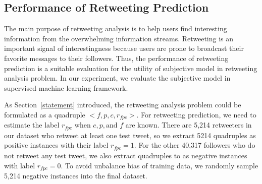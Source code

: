 \documentclass{acm_proc_article-sp}
\begin{document}
\subsection{Performance of Retweeting Prediction}
\label{performance}
The main purpose of retweeting analysis is to help users find interesting information from the overwhelming information streams. 
Retweeting is an important signal of interestingness because users are prone to broadcast their favorite messages to their followers. 
Thus, the performance of retweeting prediction is a suitable evaluation for the utility of subjective model in retweeting analysis problem.
In our experiment, we evaluate the subjective model in supervised machine learning framework.

As Section~\ref{statement} introduced, the retweeting analysis problem could be formulated as a quadruple $< f, p, c, r_{fpc} > $.
For retweeting prediction, we need to estimate the label $ r_{fpc} $ when $ c, p, \text{and } f $ are known. 
There are 5,214 retweeters in our dataset who retweet at least one test tweet, so we extract 5214 quadruples as positive instances with their label $ r_{fpc}=1 $.
For the other 40,317 followers who do not retweet any test tweet, we also extract quadruples to as negative instances with label $ r_{fpc}=0 $.
To avoid unbalance bias of training data, we randomly sample 5,214 negative instances into the final dataset.
\end{document}

